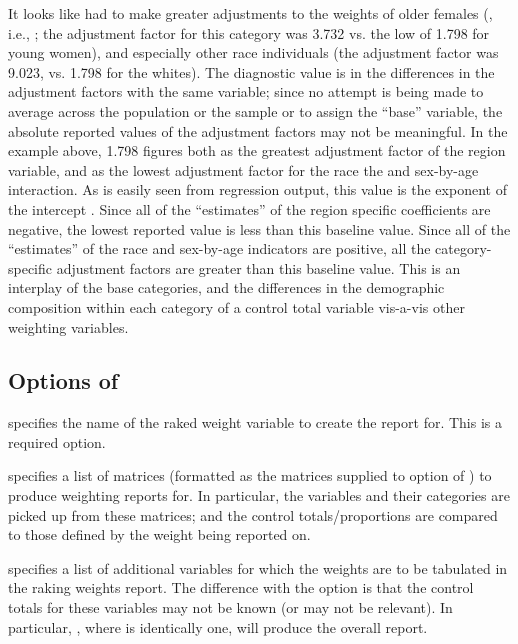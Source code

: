 \begin{stlog}
\nullskip
\end{stlog}

It looks like  had to make greater adjustments to the weights
of older females (, i.e., ;
the adjustment factor for this category was 3.732 vs. the low of 1.798 for young women),
and especially other race individuals (the adjustment factor was 9.023,
vs. 1.798 for the whites). The diagnostic value is in the differences in the adjustment
factors with the same variable; since no attempt is being made to average
across the population or the sample or to assign the ``base'' variable,
the absolute reported values of the adjustment factors may not be
meaningful. In the example above, 1.798 figures both as the greatest adjustment
factor of the region variable, and as the lowest adjustment factor
for the race the and sex-by-age interaction. As is easily seen from regression
output, this value is the exponent of the intercept .
Since all of the ``estimates'' of the region specific coefficients are negative,
the lowest reported value is less than this baseline value. Since all of the
``estimates'' of the race and sex-by-age indicators are positive, all
the category-specific adjustment factors are greater than this baseline value.
This is an interplay of the base categories, and the differences in the
demographic composition within each category of a control total variable
vis-a-vis other weighting variables.

\subsection{Options of }

\hangpara
{} specifies the name of the raked weight variable to create
    the report for. This is a required option.

\hangpara
{} specifies a list of matrices (formatted as the matrices
    supplied to  option of ) to produce weighting reports for.
    In particular, the variables and their categories are picked up from these matrices;
    and the control totals/proportions are compared to those defined by the weight being reported on.

\hangpara
{} specifies a list of additional variables for which the weights are to
    be tabulated in the raking weights report. The difference with the  option
    is that the control totals for these variables may not be known (or may not be relevant).
    In particular, , where  is identically one, will produce
    the overall report.

